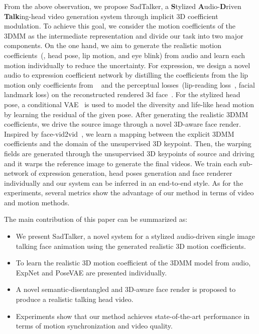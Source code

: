 From the above observation, we propose SadTalker, a \textbf{S}tylized \textbf{A}udio-\textbf{D}riven \textbf{Talk}ing-head video generation system through implicit 3D coefficient modulation. 
To achieve this goal, we consider the motion coefficients of the 3DMM as the intermediate representation and divide our task into two major components. On the one hand, we aim to generate the realistic motion coefficients~(\eg, head pose, lip motion, and eye blink) from audio and learn each motion individually to reduce the uncertainty. For expression, we design a novel audio to expression coefficient network by distilling the coefficients from the lip motion only coefficients from ~\cite{wav2lip} and the perceptual losses~(lip-reading loss~\cite{3dmm}, facial landmark loss) on the reconstructed rendered 3d face~\cite{deng2019accurate}.
For the stylized head pose, a conditional VAE~\cite{cvae} is used to model the diversity and life-like head motion by learning the residual of the given pose.
After generating the realistic 3DMM coefficients, we drive the source image through a novel 3D-aware face render. Inspired by face-vid2vid~\cite{facevid2vid}, we learn a mapping between the explicit 3DMM coefficients and the domain of the unsupervised 3D keypoint. Then, the warping fields are generated through the unsupervised 3D keypoints of source and driving and it warps the reference image to generate the final videos. We train each sub-network of expression generation, head poses generation and face renderer individually and our system can be inferred in an end-to-end style.
As for the experiments, several metrics show the advantage of our method in terms of video and motion methods.

The main contribution of this paper can be summarized as:

\begin{itemize}
    \item We present SadTalker, a novel system for a stylized audio-driven single image talking face animation using the generated realistic 3D motion coefficients.
    \item To learn the realistic 3D motion coefficient of the 3DMM model from audio, ExpNet and PoseVAE are presented individually.
    \item A novel semantic-disentangled and 3D-aware face render is proposed to produce a realistic talking head video.
    \item Experiments show that our method achieves state-of-the-art performance in terms of motion synchronization and video quality.
\end{itemize}